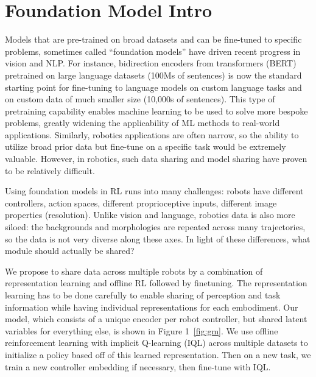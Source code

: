 
\section{Foundation Model Intro}

Models that are pre-trained on broad datasets and can be fine-tuned to specific problems, sometimes called ``foundation models'' have driven recent progress in vision and NLP.
For instance, bidirection encoders from transformers (BERT) ~\cite{devlin2019bert} pretrained on large language datasets (100Ms of sentences) is now the standard starting point for fine-tuning to language models on custom language tasks and on custom data of much smaller size (10,000s of sentences).
This type of pretraining capability enables machine learning to be used to solve more bespoke problems, greatly widening the applicability of ML methods to real-world applications.
Similarly, robotics applications are often narrow, so the ability to utilize broad prior data but fine-tune on a specific task would be extremely valuable.
However, in robotics, such data sharing and model sharing have proven to be relatively difficult.


Using foundation models in RL runs into many challenges: robots have different controllers, action spaces, different proprioceptive inputs, different image properties (resolution). Unlike vision and language, robotics data is also more siloed: the backgrounds and morphologies are repeated across many trajectories, so the data is not very diverse along these axes. In light of these differences, what module should actually be shared?

We propose to share data across multiple robots by a combination of representation learning and offline RL followed by finetuning. The representation learning has to be done carefully to enable sharing of perception and task information while having individual representations for each embodiment. Our model, which consists of a unique encoder per robot controller, but shared latent variables for everything else, is shown in Figure 1~\ref{fig:gm}. We use offline reinforcement learning with implicit Q-learning (IQL) across multiple datasets to initialize a policy based off of this learned representation. Then on a new task, we train a new controller embedding if necessary, then fine-tune with IQL.

